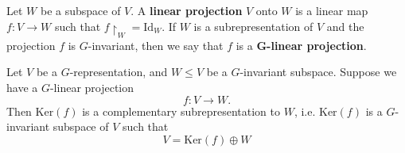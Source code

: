 \begin{frame}
\begin{definition}
Let $W$ be a subspace of $V$.  A \textbf{linear projection} $V$ onto $W$ is a linear map $f \colon V \to W$ such that $f \restriction_{W} = \text{Id}_W$.  If $W$ is a subrepresentation of $V$ and the projection $f$ is $G$-invariant, then we say that $f$ is a $\mathbf{G}$\textbf{-linear projection}.
\end{definition}
\begin{lemma} \label{maschke-lemma}
Let $V$ be a $G$-representation, and $W \leq V$ be a $G$-invariant subspace.  Suppose we have a $G$-linear projection 
\[ f \colon V \to W. \]
Then $\text{Ker}(f)$ is a complementary subrepresentation to $W$, i.e. $\text{Ker}(f)$ is a $G$-invariant subspace of $V$ such that
\[ V = \text{Ker}(f) \oplus W \]
\end{lemma}
\end{frame}

